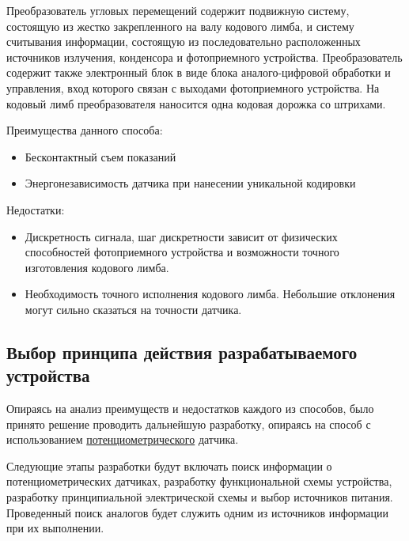 Преобразователь угловых перемещений содержит подвижную систему, состоящую из жестко закрепленного на валу кодового лимба, и систему считывания информации, состоящую из последовательно расположенных источников излучения, конденсора и фотоприемного устройства.
Преобразователь содержит также электронный блок в виде блока аналого-цифровой обработки и управления, вход которого связан с выходами фотоприемного устройства.
На кодовый лимб преобразователя наносится одна кодовая дорожка со штрихами.

Преимущества данного способа:
\begin{itemize}
    \item Бесконтактный съем показаний
    \item Энергонезависимость датчика при нанесении уникальной кодировки
\end{itemize}

Недостатки:
\begin{itemize}
    \item Дискретность сигнала, шаг дискретности зависит от физических способностей фотоприемного устройства и возможности точного изготовления кодового лимба.
    \item Необходимость точного исполнения кодового лимба. Небольшие отклонения могут сильно сказаться на точности датчика.
\end{itemize}

\subsection{Выбор принципа действия разрабатываемого устройства}\label{subsec:choise1}

Опираясь на анализ преимуществ и недостатков каждого из способов, было принято решение проводить дальнейшую разработку, опираясь на способ с использованием \underline{потенциометрического} датчика.

Следующие этапы разработки будут включать поиск информации о потенциометрических датчиках, разработку функциональной схемы устройства, разработку принципиальной электрической схемы и выбор источников питания.
Проведенный поиск аналогов будет служить одним из источников информации при их выполнении.
